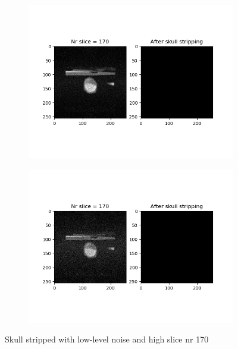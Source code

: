 \begin{figure}[H]
	\centering
	\begin{subfigure}[b]{0.35\linewidth}
		\includegraphics[scale=0.35]{figures/Module_08/M8_18.png}
	\end{subfigure}
		\begin{subfigure}[b]{0.35\linewidth}
		\includegraphics[scale=0.35]{figures/Module_08/M8_n18.png}
	\end{subfigure}
	\caption{Skull stripped with low-level noise and high slice nr 170}
	\label{fig:figures/m08_18}
\end{figure}

